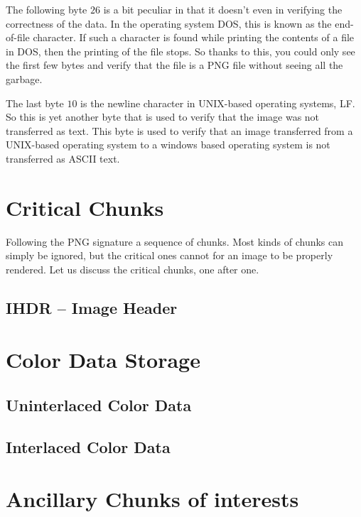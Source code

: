 The following byte $26$ is a bit peculiar in that it doesn't even in
verifying the correctness of the data. In the operating system DOS,
this is known as the end-of-file character. If such a character is
found while printing the contents of a file in DOS, then the printing
of the file stops. So thanks to this, you could only see the first few
bytes and verify that the file is a PNG file without seeing all the
garbage. 

The last byte $10$ is the newline character in UNIX-based operating
systems, LF. So this is yet another byte that is used to verify that
the image was not transferred as text. This byte is used to verify
that an image transferred from a UNIX-based operating system to a
windows based operating system is not transferred as ASCII text.

\section{Critical Chunks}

Following the PNG signature a sequence of chunks. Most kinds of chunks
can simply be ignored, but the critical ones cannot for an image to be
properly rendered. Let us discuss the critical chunks, one after one.

\subsection{IHDR -- Image Header}

\section{Color Data Storage}

\subsection{Uninterlaced Color Data}

\subsection{Interlaced Color Data}

\section{Ancillary Chunks of interests }


